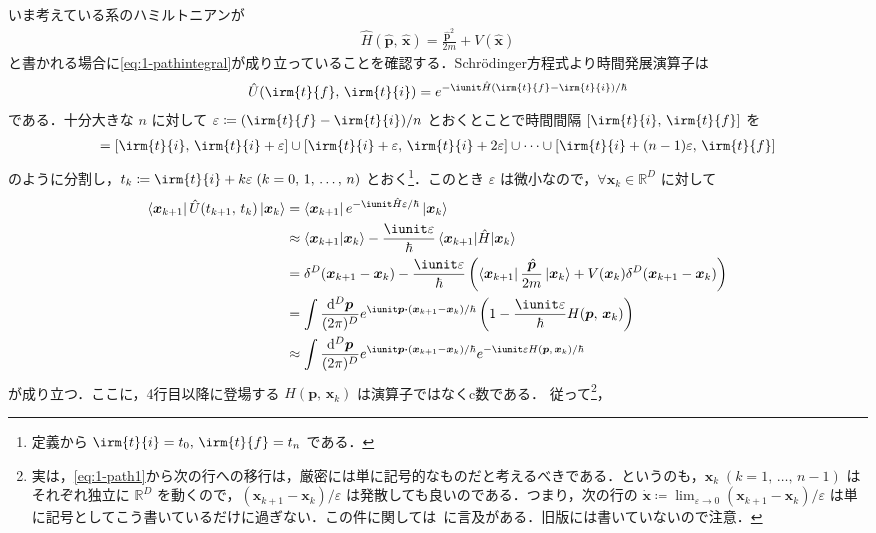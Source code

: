 \documentclass[TQFT_main]{subfiles}
\begin{document}
いま考えている系のハミルトニアンが
\begin{align}
    \hat{H} (\hat{\bm{p}},\, \hat{\bm{x}}) = \frac{\hat{\bm{p}}^2}{2m} + V(\hat{\bm{x}})
\end{align}
と書かれる場合に\eqref{eq:1-pathintegral}が成り立っていることを確認する．Schr\"{o}dinger方程式より時間発展演算子は
\begin{align}
    \hat{U}(\irm{t}{f},\, \irm{t}{i}) = e^{-\iunit \hat{H}(\irm{t}{f} - \irm{t}{i}) / \hbar} 
\end{align}
である．十分大きな $n$ に対して $\varepsilon \coloneqq (\irm{t}{f} - \irm{t}{i} )/n$ とおくとことで時間間隔 $[\irm{t}{i},\, \irm{t}{f}]$ を
\begin{align}
    [\irm{t}{i},\, \irm{t}{f}] = [\irm{t}{i},\, \irm{t}{i}+\varepsilon] \cup [\irm{t}{i}+\varepsilon,\, \irm{t}{i}+2\varepsilon] \cup \cdots \cup [\irm{t}{i}+(n-1)\varepsilon,\, \irm{t}{f}]
\end{align}
のように分割し，$t_k \coloneqq \irm{t}{i} + k\varepsilon\; (k = 0,\, 1,\, \dots,\, n)$ とおく\footnote{定義から $\irm{t}{i} = t_0,\, \irm{t}{f} = t_n$ である．}．このとき $\varepsilon$ は微小なので，$\forall \bm{x}_k \in \mathbb{R}^D$ に対して
\begin{align}
    \bra{\bm{x}_{k+1}} \hat{U}(t_{k+1},\, t_k) \ket{\bm{x}_k} &= \bra{\bm{x}_{k+1}} e^{-\iunit \hat{H} \varepsilon / \hbar} \ket{\bm{x}_k} \\
    &\approx \braket{\bm{x}_{k+1}}{\bm{x}_k} - \frac{\iunit \varepsilon}{\hbar} \mel{\bm{x}_{k+1}}{\hat{H}}{\bm{x}_k} \\
    &= \delta^D (\bm{x}_{k+1} - \bm{x}_k) - \frac{\iunit \varepsilon}{\hbar} \left( \bra{\bm{x}_{k+1}} \frac{\hat{\bm{p}}}{2m} \ket{\bm{x}_k} + V (\bm{x}_k) \delta^D (\bm{x}_{k+1} - \bm{x}_k) \right) \\
    &= \int \frac{\dd^D \bm{p}}{(2\pi)^D} e^{\iunit \bm{p} \vdot (\bm{x}_{k+1} - \bm{x}_k)/\hbar} \left( 1 - \frac{\iunit \varepsilon}{\hbar} H (\bm{p},\, \bm{x}_k)  \right)\\
    &\approx \int \frac{\dd^D \bm{p}}{(2\pi)^D} e^{\iunit \bm{p} \vdot (\bm{x}_{k+1} - \bm{x}_k)/\hbar} e^{-\iunit \varepsilon H (\bm{p},\, \bm{x}_k) / \hbar}
\end{align}
が成り立つ．ここに，4行目以降に登場する $H (\bm{p},\, \bm{x}_k)$ は演算子ではなくc数である．
従って\footnote{実は，\eqref{eq:1-path1}から次の行への移行は，厳密には単に記号的なものだと考えるべきである．というのも，$\bm{x}_k\; (k=1,\, \dots,\, n-1)$ はそれぞれ独立に $\mathbb{R}^D$ を動くので，$(\bm{x}_{k+1} - \bm{x}_k)/\varepsilon$ は発散しても良いのである．つまり，次の行の $\dot{\bm{x}} \coloneqq \lim_{\varepsilon \to 0} (\bm{x}_{k+1} - \bm{x}_k)/\varepsilon$ は単に記号としてこう書いているだけに過ぎない．この件に関しては~\cite[第1章, p.23]{Nakahara2018topo1}に言及がある．旧版には書いていないので注意．}，
\end{document}
